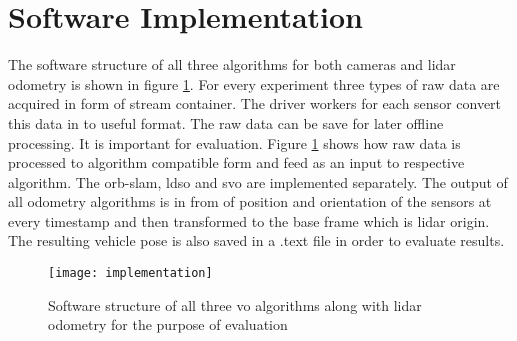 \section{Software Implementation}
The software structure of all three algorithms for both cameras and \acrshort{lidar} odometry is shown in figure \ref{fig:implementation}. For every experiment three types of raw data are acquired in form of stream container. The driver workers for each sensor convert this data in to useful format. The raw data can be save for later offline processing. It is important for evaluation. Figure \ref{fig:implementation} shows how raw data is processed to algorithm compatible form and feed as an input to respective algorithm. The \acrshort{orb}-\acrshort{slam}, \acrshort{ldso} and \acrshort{svo} are implemented separately. The output of all odometry algorithms is in from of position and orientation of the sensors at every timestamp and then transformed to the base frame which is \acrshort{lidar} origin. The resulting vehicle pose is also saved in a .text file in order to evaluate results.\\
\begin{figure}[H]
	\centering
	\texttt{[image: implementation]}
	\caption{Software structure of all three \acrshort{vo} algorithms along with \acrshort{lidar} odometry for the purpose of evaluation}
	\label{fig:implementation}
\end{figure}

